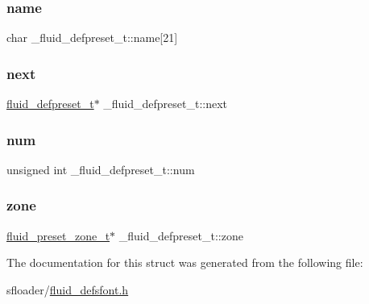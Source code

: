 \subsubsection{\texorpdfstring{name}{name}}
{\footnotesize\ttfamily char \+\_\+fluid\+\_\+defpreset\+\_\+t\+::name\mbox{[}21\mbox{]}}

\mbox{\label{struct__fluid__defpreset__t_a3e0dabe06dd2004596b5b130075b197d}} 
\subsubsection{\texorpdfstring{next}{next}}
{\footnotesize\ttfamily \hyperlink{fluid__defsfont_8h_a2c2cb41581f95588f665a8f8fe593e18}{fluid\+\_\+defpreset\+\_\+t}$\ast$ \+\_\+fluid\+\_\+defpreset\+\_\+t\+::next}

\mbox{\label{struct__fluid__defpreset__t_a401ae39156d3d4c41a5a76a754495abf}} 
\subsubsection{\texorpdfstring{num}{num}}
{\footnotesize\ttfamily unsigned int \+\_\+fluid\+\_\+defpreset\+\_\+t\+::num}

\mbox{\label{struct__fluid__defpreset__t_a470612eff6fe4a286e48a013b17cafdd}} 
\subsubsection{\texorpdfstring{zone}{zone}}
{\footnotesize\ttfamily \hyperlink{fluid__defsfont_8h_a74cb7075332911049d39e60df50019b2}{fluid\+\_\+preset\+\_\+zone\+\_\+t}$\ast$ \+\_\+fluid\+\_\+defpreset\+\_\+t\+::zone}



The documentation for this struct was generated from the following file\+:\begin{DoxyCompactItemize}
\item 
sfloader/\hyperlink{fluid__defsfont_8h}{fluid\+\_\+defsfont.\+h}\end{DoxyCompactItemize}
